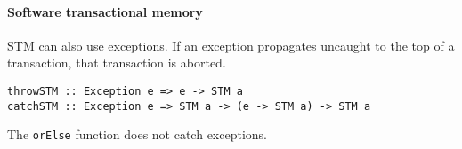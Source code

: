 \paragraph{Software transactional memory}
STM can also use exceptions.  If an exception propagates uncaught to the top of
a transaction, that transaction is aborted.

\begin{verbatim}
throwSTM :: Exception e => e -> STM a
catchSTM :: Exception e => STM a -> (e -> STM a) -> STM a
\end{verbatim}

The \verb|orElse| function does not catch exceptions.
